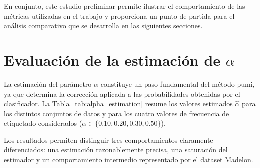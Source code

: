 En conjunto, este estudio preliminar permite ilustrar el comportamiento de las métricas utilizadas en el trabajo y proporciona un punto de partida para el análisis comparativo que se desarrolla en las siguientes secciones.

\section[Evaluación de la estimación de \texorpdfstring{$\alpha$}{alpha}]{Evaluación de la estimación de $\alpha$}
\label{sec:eval_alpha}

La estimación del parámetro $\alpha$ constituye un paso fundamental del método \acrshort{pumi}, ya que determina la corrección aplicada a las probabilidades obtenidas por el clasificador. La Tabla~\ref{tab:alpha_estimation} resume los valores estimados $\hat{\alpha}$ para los distintos conjuntos de datos y para los cuatro valores de frecuencia de etiquetado considerados ($\alpha\in\{0.10,0.20,0.30,0.50\}$).

Los resultados permiten distinguir tres comportamientos claramente diferenciados: una estimación razonablemente precisa, una saturación del estimador y un comportamiento intermedio representado por el dataset Madelon.

\begin{table}[ht]
\centering
\caption{Estimaciones de $\hat{\alpha}$ para los distintos conjuntos de datos.}
\label{tab:alpha_estimation}
\small
{}
\end{table}

